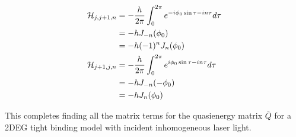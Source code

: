 \begin{align}
  \mathcal{H}_{j,j+1,n} &= -\dfrac{h}{2\pi} \int_0^{2\pi} e^{-i \phi_0 \sin \tau - in\tau} d\tau \nonumber \\
  &= -h J_{-n}(\phi_0) \nonumber \\
  &= -h (-1)^n J_n(\phi_0) \\
  \mathcal{H}_{j+1,j,n} &= -\dfrac{h}{2\pi} \int_0^{2\pi} e^{i \phi_0 \sin \tau - in\tau} d\tau \nonumber \\
    &= -h J_{-n}(-\phi_0) \nonumber \\
    &= -h J_n(\phi_0)
\end{align}

This completes finding all the matrix terms for the quasienergy matrix $\bar{Q}$ for a 2DEG tight binding model with incident inhomogeneous laser light.



